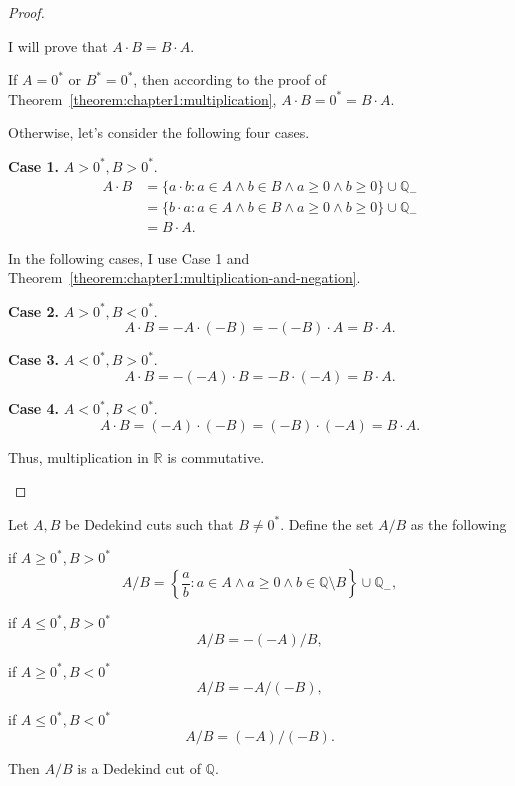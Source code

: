 \begin{proof}
\begin{enumerate}[label={(F\arabic*)}, start=5]
              I will prove that $A\cdot B = B\cdot A$.

              If $A = {0}^{*}$ or $B^{*} = {0}^{*}$, then according to the proof of Theorem~\ref{theorem:chapter1:multiplication}, $A\cdot B = {0}^{*} = B\cdot A$.

              Otherwise, let's consider the following four cases.

              \textbf{Case 1.} $A > {0}^{*}, B > {0}^{*}$.
              \begin{align*}
                  A\cdot B & = \{ a\cdot b : a\in A\land b\in B\land a\ge 0\land b\ge 0 \}\cup\mathbb{Q}_{-} \\
                           & = \{ b\cdot a : a\in A\land b\in B\land a\ge 0\land b\ge 0 \}\cup\mathbb{Q}_{-} \\
                           & = B\cdot A.
              \end{align*}

              In the following cases, I use Case 1 and Theorem~\ref{theorem:chapter1:multiplication-and-negation}.

              \textbf{Case 2.} $A > {0}^{*}, B < {0}^{*}$.
              \[
                  A\cdot B = -A\cdot (-B) = -(-B)\cdot A = B\cdot A.
              \]

              \textbf{Case 3.} $A < {0}^{*}, B > {0}^{*}$.
              \[
                  A\cdot B = -(-A)\cdot B = -B\cdot (-A) = B\cdot A.
              \]

              \textbf{Case 4.} $A < {0}^{*}, B < {0}^{*}$.
              \[
                  A\cdot B = (-A)\cdot (-B) = (-B)\cdot (-A) = B\cdot A.
              \]

              Thus, multiplication in $\mathbb{R}$ is commutative.
    \end{enumerate}
\end{proof}

\begin{theorem}\label{theorem:chapter1:division}
    Let $A, B$ be Dedekind cuts such that $B\ne {0}^{*}$. Define the set $A/B$ as the following

    if $A\ge {0}^{*}, B > {0}^{*}$
    \[
        A/B = \left\{ \frac{a}{b} : a\in A\land a\ge 0\land b\in\mathbb{Q}\setminus B \right\}\cup\mathbb{Q}_{-},
    \]

    if $A\le {0}^{*}, B > {0}^{*}$
    \[
        A/B = -(-A)/B,
    \]

    if $A\ge {0}^{*}, B < {0}^{*}$
    \[
        A/B = -A/(-B),
    \]

    if $A\le {0}^{*}, B < {0}^{*}$
    \[
        A/B = (-A)/(-B).
    \]

    Then $A/B$ is a Dedekind cut of $\mathbb{Q}$.
\end{theorem}

